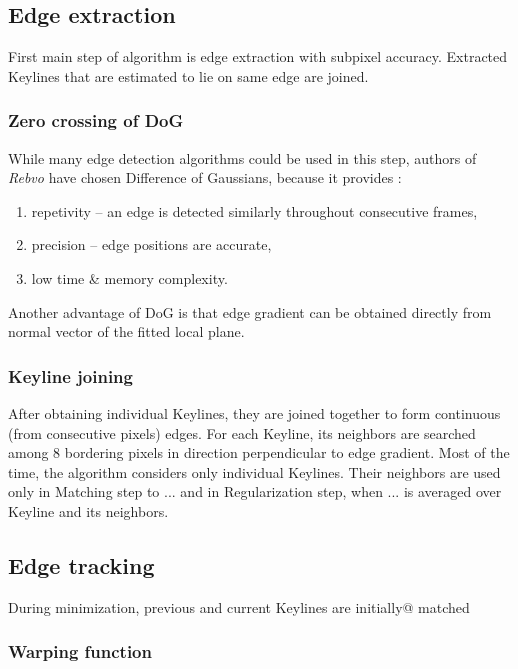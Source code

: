 
\subsection{Edge extraction}

First main step of algorithm is edge extraction with subpixel accuracy. Extracted Keylines that are estimated to lie on same edge are joined.

\subsubsection{Zero crossing of DoG}
While many edge detection algorithms could be used in this step, authors of \textit{Rebvo} have chosen Difference of Gaussians, because it provides \cite{jose2015realtime}:
\begin{enumerate}
	\item repetivity -- an edge is detected similarly throughout consecutive frames,
	\item precision -- edge positions are accurate,
	\item low time \& memory complexity.
\end{enumerate}

Another advantage of DoG is that edge gradient can be obtained directly from normal vector of the fitted local plane.

\subsubsection{Keyline joining}

After obtaining individual Keylines, they are joined together to form continuous (from consecutive pixels) edges. %
For each Keyline, its neighbors are searched among 8 bordering pixels in direction perpendicular to edge gradient.
Most of the time, the algorithm considers only individual Keylines. Their neighbors are used only in Matching step to ... %
and in Regularization step, when ... %
is averaged over Keyline and its neighbors.



\subsection{Edge tracking}

During minimization, previous and current Keylines are initially@ matched

\subsubsection{Warping function}

